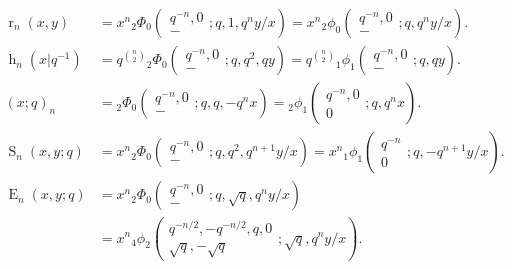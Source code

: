 \documentclass{cimart}
\DeclareMathOperator{\opE}{E}
\DeclareMathOperator{\oph}{h}
\DeclareMathOperator{\opr}{r}
\DeclareMathOperator{\opS}{S}
\begin{document}
\begin{align*}
    \opr_{n}(x,y)&=x^n{}_{2}\Phi_{0}\left(
    \begin{array}{c}
         q^{-n},0 \\
         -
    \end{array}
    ;q,1,q^n y/x    
    \right)=x^n{}_{2}\phi_{0}\left(
    \begin{array}{c}
         q^{-n},0 \\
         -
    \end{array}
    ;q,q^n y/x    
    \right).\\
    \oph_{n}(x|q^{-1})&=q^{\binom{n}{2}}{}_{2}\Phi_{0}\left(
    \begin{array}{c}
         q^{-n},0 \\
         -
    \end{array}
    ;q,q^2,qy    
    \right)=q^{\binom{n}{2}}{}_{1}\phi_{1}\left(
    \begin{array}{c}
         q^{-n},0 \\
         -
    \end{array}
    ;q, qy    
    \right).\\
    (x;q)_{n}&={}_{2}\Phi_{0}\left(
    \begin{array}{c}
         q^{-n},0 \\
         -
    \end{array}
    ;q,q,-q^{n}x    
    \right)={}_{2}\phi_{1}\left(
    \begin{array}{c}
         q^{-n},0 \\
         0
    \end{array}
    ;q,q^{n}x
    \right).\\
    \opS_{n}(x,y;q)&=x^n{}_{2}\Phi_{0}\left(
    \begin{array}{c}
         q^{-n},0 \\
         -
    \end{array}
    ;q,q^2,q^{n+1}y/x
    \right)=x^n{}_{1}\phi_{1}\left(
    \begin{array}{c}
         q^{-n} \\
         0
    \end{array}
    ;q,-q^{n+1}y/x    
    \right).\\
    \opE_{n}(x,y;q)&=x^{n
    }{}_{2}\Phi_{0}\left(
    \begin{array}{c}
         q^{-n},0 \\
         -
    \end{array}
    ;q,\sqrt{q},q^{n}y/x    
    \right)\\
    &=x^n{}_{4}\phi_{2}\left(
    \begin{array}{c}
         q^{-n/2},-q^{-n/2},q,0 \\
         \sqrt{q},-\sqrt{q}
    \end{array}
    ;\sqrt{q},q^{n}y/x    
    \right).
\end{align*}
\end{document}
